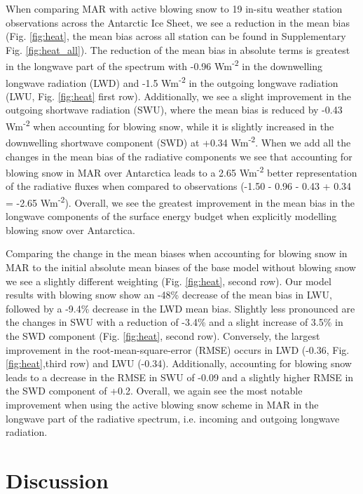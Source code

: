\documentclass[12pt]{article}
\begin{document}
When comparing MAR with active blowing snow to 19 in-situ weather station observations across the Antarctic Ice Sheet, we see a reduction in the mean bias (Fig. \ref{fig:heat}, the mean bias across all station can be found in Supplementary Fig. \ref{fig:heat_all}). The reduction of the mean bias in absolute terms is greatest in the longwave part of the spectrum with -0.96 Wm\textsuperscript{-2} in the downwelling longwave radiation (LWD) and -1.5 Wm\textsuperscript{-2} in the outgoing longwave radiation (LWU, Fig. \ref{fig:heat} first row). Additionally, we see a slight improvement in the outgoing shortwave radiation (SWU), where the mean bias is reduced by -0.43 Wm\textsuperscript{-2} when accounting for blowing snow, while it is slightly increased in the downwelling shortwave component (SWD) at +0.34 Wm\textsuperscript{-2}.  When we add all the changes in the mean bias of the radiative components we see that accounting for blowing snow in MAR over Antarctica leads to a 2.65 Wm\textsuperscript{-2} better representation of the radiative fluxes when compared to observations (-1.50 - 0.96 - 0.43 + 0.34 = -2.65 Wm\textsuperscript{-2}). Overall, we see the greatest improvement in the mean bias in the longwave components of the surface energy budget when explicitly modelling blowing snow over Antarctica.

Comparing the change in the mean biases when accounting for blowing snow in MAR to the initial absolute mean biases of the base model without blowing snow we see a slightly different weighting (Fig. \ref{fig:heat}, second row). Our model results with blowing snow show an -48\% decrease of the mean bias in LWU, followed by a -9.4\% decrease in the LWD mean bias. Slightly less pronounced are the changes in SWU with a reduction of -3.4\% and a slight increase of 3.5\% in the SWD component (Fig. \ref{fig:heat}, second row). Conversely, the largest improvement in the root-mean-square-error (RMSE) occurs in LWD (-0.36, Fig. \ref{fig:heat},third row) and LWU (-0.34).  Additionally, accounting for blowing snow leads to a decrease in the RMSE in SWU of -0.09 and a slightly higher RMSE in the SWD component of +0.2. Overall, we again see the most notable improvement when using the active blowing snow scheme in MAR in the longwave part of the radiative spectrum, i.e. incoming and outgoing longwave radiation.

\section*{Discussion}
\end{document}
